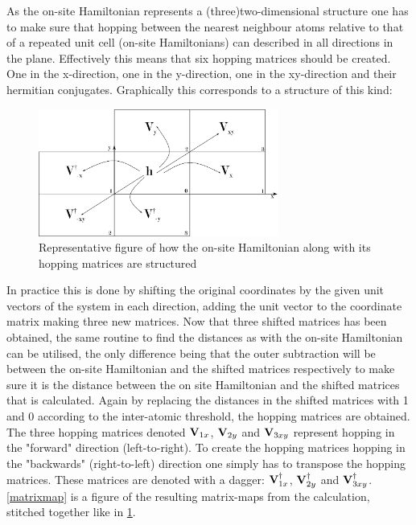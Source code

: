 As the on-site Hamiltonian represents a (three)two-dimensional structure one has to make sure that hopping between the nearest neighbour atoms relative to that of a repeated unit cell (on-site Hamiltonians) can described in all directions in the plane. Effectively this means that six hopping matrices should be created. One in the x-direction, one in the y-direction, one in the xy-direction and their hermitian conjugates. Graphically this corresponds to a structure of this kind:
\begin{figure}[H]
    \centering
    \includegraphics[width = 0.7\textwidth]{Figures/repfig.eps}
    \caption{Representative figure of how the on-site Hamiltonian along with its hopping matrices are structured}
    \label{repfig}
\end{figure}
In practice this is done by shifting the original coordinates by the given unit vectors of the system in each direction, adding the unit vector to the coordinate matrix making three new matrices. Now that three shifted matrices has been obtained, the same routine to find the distances as with the on-site Hamiltonian can be utilised, the only difference being that the outer subtraction will be between the on-site Hamiltonian and the shifted matrices respectively to make sure it is the distance between the on site Hamiltonian and the shifted matrices that is calculated. Again by replacing the distances in the shifted matrices with 1 and 0 according to the inter-atomic threshold, the hopping matrices are obtained. The three hopping matrices denoted \(\vb{V}_{1x}\), \(\vb{V}_{2y}\) and \(\vb{V}_{3xy}\) represent hopping in the "forward" direction (left-to-right). To create the hopping matrices hopping in the "backwards" (right-to-left) direction one simply has to transpose the hopping matrices. These matrices are denoted with a dagger: \(\vb{V}_{1x}^{\dagger}\), \(\vb{V}_{2y}^{\dagger}\) and \(\vb{V}_{3xy}^{\dagger}\). \cref{matrixmap} is a figure of the resulting matrix-maps from the calculation, stitched together like in \cref{repfig}.

